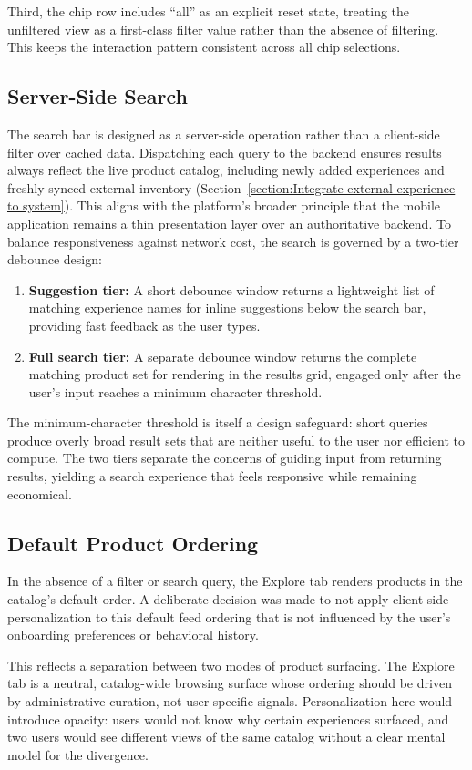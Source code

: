 Third, the chip row includes ``all'' as an explicit reset state, treating the unfiltered view as a first-class filter value rather than the absence of filtering. This keeps the interaction pattern consistent across all chip selections.

\subsection{Server-Side Search}
The search bar is designed as a server-side operation rather than a client-side filter over cached data. Dispatching each query to the backend ensures results always reflect the live product catalog, including newly added experiences and freshly synced external inventory (Section~\ref{section:Integrate external experience to system}). This aligns with the platform's broader principle that the mobile application remains a thin presentation layer over an authoritative backend.
To balance responsiveness against network cost, the search is governed by a two-tier debounce design:
\begin{enumerate}
    \item \textbf{Suggestion tier:} A short debounce window returns a lightweight list of matching experience names for inline suggestions below the search bar, providing fast feedback as the user types.
    \item \textbf{Full search tier:} A separate debounce window returns the complete matching product set for rendering in the results grid, engaged only after the user's input reaches a minimum character threshold.
\end{enumerate}
The minimum-character threshold is itself a design safeguard: short queries produce overly broad result sets that are neither useful to the user nor efficient to compute. The two tiers separate the concerns of guiding input from returning results, yielding a search experience that feels responsive while remaining economical.

\subsection{Default Product Ordering}
In the absence of a filter or search query, the Explore tab renders products in the catalog's default order. A deliberate decision was made to not apply client-side personalization to this default feed ordering that is not influenced by the user's onboarding preferences or behavioral history.

This reflects a separation between two modes of product surfacing. The Explore tab is a neutral, catalog-wide browsing surface whose ordering should be driven by administrative curation, not user-specific signals. Personalization here would introduce opacity: users would not know why certain experiences surfaced, and two users would see different views of the same catalog without a clear mental model for the divergence.

